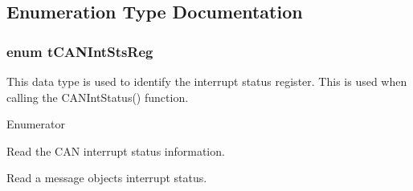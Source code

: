 \subsection{Enumeration Type Documentation}
\subsubsection[{\texorpdfstring{t\+C\+A\+N\+Int\+Sts\+Reg}{tCANIntStsReg}}]{\setlength{\rightskip}{0pt plus 5cm}enum {\bf t\+C\+A\+N\+Int\+Sts\+Reg}}\hypertarget{group__can__api_ga73584383f566e98bf822b371a03becfc}{}\label{group__can__api_ga73584383f566e98bf822b371a03becfc}
This data type is used to identify the interrupt status register. This is used when calling the C\+A\+N\+Int\+Status() function. \begin{Desc}
\item[Enumerator]\par
\begin{description}
\item[{\em 
C\+A\+N\+\_\+\+I\+N\+T\+\_\+\+S\+T\+S\+\_\+\+C\+A\+U\+SE\hypertarget{group__can__api_gga73584383f566e98bf822b371a03becfcaaab739e796c1216de72acf16410795a5}{}\label{group__can__api_gga73584383f566e98bf822b371a03becfcaaab739e796c1216de72acf16410795a5}
}]Read the C\+AN interrupt status information. \item[{\em 
C\+A\+N\+\_\+\+I\+N\+T\+\_\+\+S\+T\+S\+\_\+\+O\+B\+J\+E\+CT\hypertarget{group__can__api_gga73584383f566e98bf822b371a03becfca8cb85391f55d762fcff16bb285903304}{}\label{group__can__api_gga73584383f566e98bf822b371a03becfca8cb85391f55d762fcff16bb285903304}
}]Read a message object\textquotesingle{}s interrupt status. \end{description}
\end{Desc}
